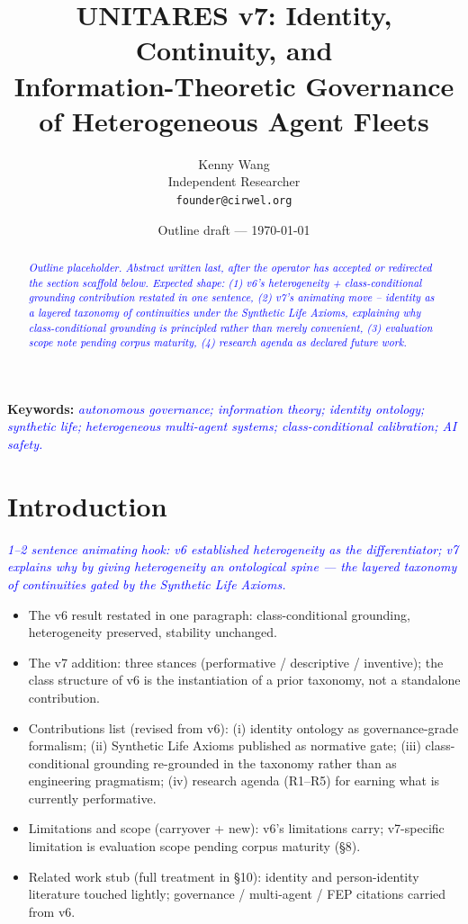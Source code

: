 \documentclass[11pt,twocolumn]{article}
\title{UNITARES v7: Identity, Continuity, and\\
Information-Theoretic Governance\\
of Heterogeneous Agent Fleets}
\author{
  Kenny Wang\\
  Independent Researcher\\
  \texttt{founder@cirwel.org}
}
\date{Outline draft --- \today}
\newcommand{\outlinenote}[1]{\textcolor{blue}{\textit{#1}}}
\begin{document}
\maketitle

\begin{abstract}
\outlinenote{Outline placeholder. Abstract written last, after the
operator has accepted or redirected the section scaffold below.
Expected shape: (1) v6's heterogeneity + class-conditional grounding
contribution restated in one sentence, (2) v7's animating move --
identity as a layered taxonomy of continuities under the Synthetic
Life Axioms, explaining why class-conditional grounding is
principled rather than merely convenient, (3) evaluation scope
note pending corpus maturity, (4) research agenda as declared
future work.}
\end{abstract}

\textbf{Keywords:} \outlinenote{autonomous governance; information
theory; identity ontology; synthetic life; heterogeneous
multi-agent systems; class-conditional calibration; AI safety.}

\section{Introduction}
\outlinenote{1--2 sentence animating hook: v6 established
heterogeneity as the differentiator; v7 explains why by giving
heterogeneity an ontological spine — the layered taxonomy of
continuities gated by the Synthetic Life Axioms.}

\begin{itemize}
  \item The v6 result restated in one paragraph: class-conditional
        grounding, heterogeneity preserved, stability unchanged.
  \item The v7 addition: three stances (performative / descriptive /
        inventive); the class structure of v6 is the instantiation
        of a prior taxonomy, not a standalone contribution.
  \item Contributions list (revised from v6):
        (i) identity ontology as governance-grade formalism;
        (ii) Synthetic Life Axioms published as normative gate;
        (iii) class-conditional grounding re-grounded in the
        taxonomy rather than as engineering pragmatism;
        (iv) research agenda (R1--R5) for earning what is
        currently performative.
  \item Limitations and scope (carryover + new): v6's limitations
        carry; v7-specific limitation is evaluation scope pending
        corpus maturity (§8).
  \item Related work stub (full treatment in §10): identity and
        person-identity literature touched lightly; governance /
        multi-agent / FEP citations carried from v6.
\end{itemize}
\end{document}
